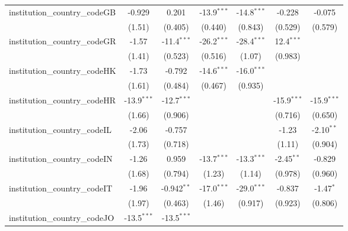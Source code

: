 \begin{tabular}{lcccccc}
   institution\_country\_codeGB          & -0.929        & 0.201         & -13.9$^{***}$ & -14.8$^{***}$ & -0.228        & -0.075\\   
                                         & (1.51)        & (0.405)       & (0.440)       & (0.843)       & (0.529)       & (0.579)\\   
   institution\_country\_codeGR          & -1.57         & -11.4$^{***}$ & -26.2$^{***}$ & -28.4$^{***}$ & 12.4$^{***}$  &   \\   
                                         & (1.41)        & (0.523)       & (0.516)       & (1.07)        & (0.983)       &   \\   
   institution\_country\_codeHK          & -1.73         & -0.792        & -14.6$^{***}$ & -16.0$^{***}$ &               &   \\   
                                         & (1.61)        & (0.484)       & (0.467)       & (0.935)       &               &   \\   
   institution\_country\_codeHR          & -13.9$^{***}$ & -12.7$^{***}$ &               &               & -15.9$^{***}$ & -15.9$^{***}$\\   
                                         & (1.66)        & (0.906)       &               &               & (0.716)       & (0.650)\\   
   institution\_country\_codeIL          & -2.06         & -0.757        &               &               & -1.23         & -2.10$^{**}$\\   
                                         & (1.73)        & (0.718)       &               &               & (1.11)        & (0.904)\\   
   institution\_country\_codeIN          & -1.26         & 0.959         & -13.7$^{***}$ & -13.3$^{***}$ & -2.45$^{**}$  & -0.829\\   
                                         & (1.68)        & (0.794)       & (1.23)        & (1.14)        & (0.978)       & (0.960)\\   
   institution\_country\_codeIT          & -1.96         & -0.942$^{**}$ & -17.0$^{***}$ & -29.0$^{***}$ & -0.837        & -1.47$^{*}$\\   
                                         & (1.97)        & (0.463)       & (1.46)        & (0.917)       & (0.923)       & (0.806)\\   
   institution\_country\_codeJO          & -13.5$^{***}$ & -13.5$^{***}$ &               &               &               &   \\   

\end{tabular}
